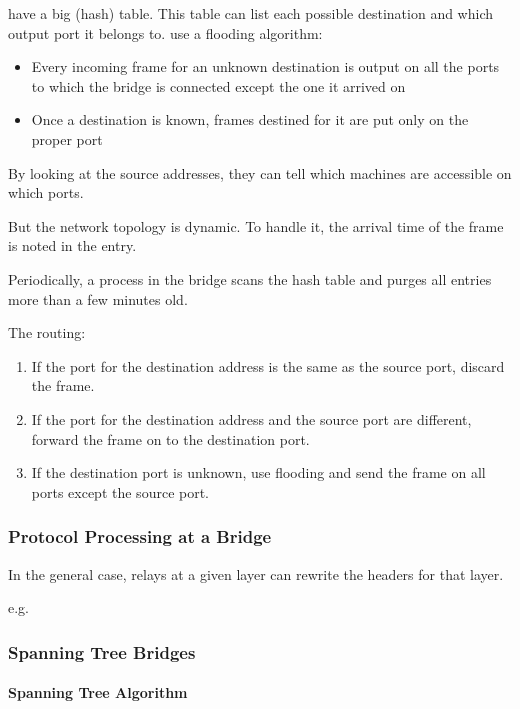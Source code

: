 
have a big (hash) table. This table can list each possible destination and which output port it belongs to.  use a flooding algorithm:
\begin{itemize}
    \item Every incoming frame for an unknown destination is output on all the ports to
    which the bridge is connected except the one it arrived on
    \item Once a destination is known, frames destined for it are put only on the proper port
\end{itemize}

By looking at the source addresses, they can tell which machines are accessible on which ports. 

But the network topology is dynamic. To handle it, the arrival time of the frame is noted in the entry. 

Periodically, a process in the bridge scans the hash table and purges all entries more than a few minutes old.

The routing:
\begin{enumerate}
    \item If the port for the destination address is the same as the source port, discard the frame.
    \item If the port for the destination address and the source port are different, forward the frame on to the destination port.
    \item If the destination port is unknown, use flooding and send the frame on all ports except the source port.
\end{enumerate}

\subsubsection{Protocol Processing at a Bridge}
In the general case, relays at a given layer can rewrite the headers for that layer.


e.g. %

\subsubsection{Spanning Tree Bridges}%


\paragraph{Spanning Tree Algorithm}

